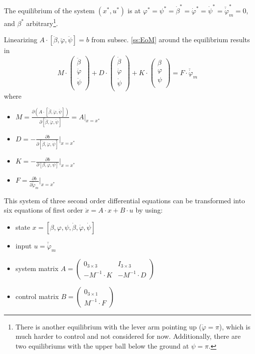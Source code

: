 \documentclass{article}
\begin{document}
The equilibrium of the system $(x^*, u^*)$ is at $\varphi^* = \psi^* = \dot{\beta}^* = \dot{\varphi}^* = \dot{\psi}^* = \breve{\dot{\varphi}}_m^* = 0$, and $\beta^*$ arbitrary\footnote{
There is another equilibrium with the lever arm pointing up ($\dot{\varphi} = \pi$), which is much harder to control and not considered for now. Additionally, there are two equilibriums with the upper ball below the ground at $\psi = \pi$.}.

Linearizing $A \cdot [\ddot{\beta}, \ddot{\varphi}, \ddot{\psi}] = b$ from subsec. \ref{ss:EoM} around the equilibrium results in
\begin{equation}
M \cdot \left( {\begin{array}{c} \ddot{\beta} \\ \ddot{\varphi} \\ \ddot{\psi} \\ \end{array} } \right) +
D \cdot \left( {\begin{array}{c} \dot{\beta} \\ \dot{\varphi} \\ \dot{\psi} \\ \end{array} } \right) +
K \cdot \left( {\begin{array}{c} \beta \\ \varphi \\ \psi \\ \end{array} } \right) =
F \cdot \breve{\dot{\varphi}}_m
\end{equation}
where
\begin{itemize}
	\item $M = \frac{\partial \left(A \cdot [\ddot{\beta}, \ddot{\varphi}, \ddot{\psi}] \right)}{\partial [\ddot{\beta}, \ddot{\varphi}, \ddot{\psi}]} = A\Big|_{x=x^*}$
	\item $D = -\frac{\partial b}{\partial [\dot{\beta}, \dot{\varphi}, \dot{\psi}]}\Big|_{x=x^*}$
	\item $K = -\frac{\partial b}{\partial [\beta, \varphi, \psi]}\Big|_{x=x^*}$
	\item $F = \frac{\partial b}{\partial \breve{\dot{\varphi}}_m}\Big|_{x=x^*}$
\end{itemize}
This system of three second order differential equations can be transformed into six equations of first order $\dot{x} = A \cdot x + B \cdot u$ by using:
\begin{itemize}
	\item state $x = [\beta, \varphi, \psi, \dot{\beta}, \dot{\varphi}, \dot{\psi}]$
	\item input $u = \breve{\dot{\varphi}}_m$
	\item system matrix $A = \left( {\begin{array}{cc} 0_{3 \times 3} & I_{3 \times 3} \\ -M^{-1} \cdot K & -M^{-1} \cdot D  \end{array} } \right)$
	\item control matrix $B = \left( {\begin{array}{c} 0_{3 \times 1} \\ M^{-1} \cdot F \end{array} } \right)$
\end{itemize}
\end{document}
